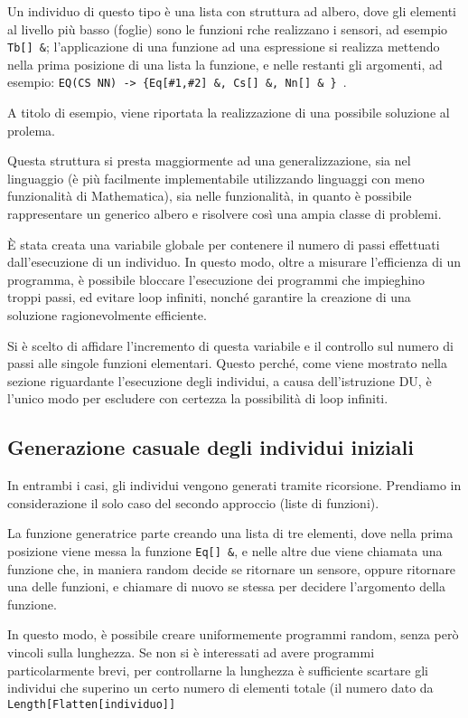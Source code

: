 \documentclass[paper=a4, fontsize=11pt]{scrartcl}
\numberwithin{equation}{section}		%
\numberwithin{figure}{section}			%
\numberwithin{table}{section}				%
\begin{document}
Un individuo di questo tipo è una lista con struttura ad albero, dove gli elementi al livello più basso (foglie) sono le funzioni rche realizzano i sensori, ad esempio \texttt{Tb[] \&};  l'applicazione di una funzione ad una espressione si realizza mettendo nella prima posizione di una lista la funzione, e nelle restanti gli argomenti, ad esempio:  \texttt{EQ(CS NN) -> \{Eq[\#1,\#2] \&, Cs[] \&, Nn[] \& \} }.

A titolo di esempio, viene riportata la realizzazione di una possibile soluzione al prolema.


Questa struttura si presta maggiormente ad una generalizzazione, sia nel linguaggio (è più facilmente implementabile utilizzando linguaggi con meno funzionalità di Mathematica), sia nelle funzionalità, in quanto è possibile rappresentare un generico albero e risolvere così una ampia classe di problemi.

È stata creata una variabile globale per contenere il numero di passi effettuati dall'esecuzione di un individuo. In questo modo, oltre a misurare l'efficienza di un programma, è possibile bloccare l'esecuzione dei programmi che impieghino troppi passi, ed evitare loop infiniti, nonché garantire la creazione di una soluzione ragionevolmente efficiente.

Si è scelto di affidare l'incremento di questa variabile e il controllo sul numero di passi alle singole funzioni elementari. Questo perché, come viene mostrato nella sezione riguardante l'esecuzione degli individui, a causa dell'istruzione DU, è l'unico modo per escludere con certezza la possibilità di loop infiniti. 




\subsection{Generazione casuale degli individui iniziali}
In entrambi i casi, gli individui vengono generati tramite ricorsione. Prendiamo in considerazione il solo caso del secondo approccio (liste di funzioni). 

La funzione generatrice parte creando una lista di tre elementi, dove nella prima posizione viene messa la funzione \texttt{Eq[] \&}, e nelle altre due viene chiamata una funzione che, in maniera random decide se ritornare un sensore, oppure ritornare una delle funzioni, e chiamare di nuovo se stessa per decidere l'argomento della funzione.


In questo modo, è possibile creare uniformemente programmi random, senza però vincoli sulla lunghezza. 
Se non si è interessati ad avere programmi particolarmente brevi, per controllarne la lunghezza è sufficiente scartare gli individui che superino un certo numero di elementi totale (il numero dato da \texttt{Length[Flatten[individuo]]}
\end{document}

